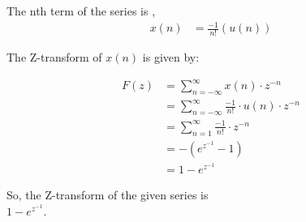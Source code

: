 \documentclass[journal,12pt,twocolumn]{IEEEtran}
\begin{document}
The nth term of the series is , 
\begin{align*}
    x(n) & = \frac{-1}{n!} (u(n))
\end{align*} 

The Z-transform of \( x(n) \) is given by:

\begin{align*}
    F(z) & = \sum_{n=-\infty}^{\infty} x(n) \cdot z^{-n} \\
    & = \sum_{n=-\infty}^{\infty} \frac{-1}{n!}\cdot u(n) \cdot z^{-n} \\
    & = \sum_{n=1}^{\infty} \frac{-1}{n!} \cdot z^{-n} \\
    & = - (e^{z^{-1}} - 1) \\
    & = 1 - e^{z^{-1}}  
\end{align*}

So, the Z-transform of the given series is \\
\( 1 - e^{z^{-1}} \).
\end{document}
